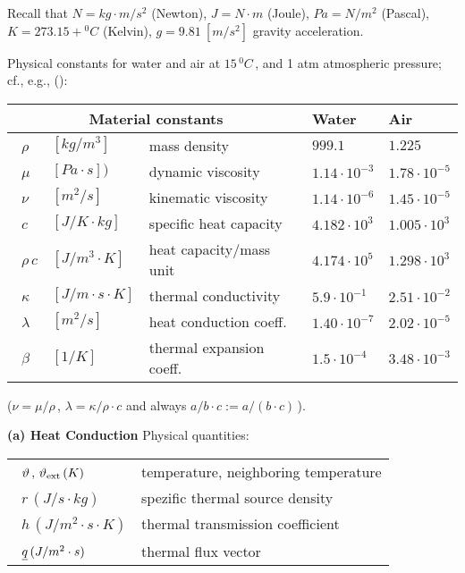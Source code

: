 \documentclass[12pt,a4paper,USenglish,twoside]{book}
\begin{document}
Recall that $N = kg\cdot m/s^2$ (Newton), $J = N\cdot m$ (Joule),
$Pa = N/m^2$ (Pascal),\\
$K = 273.15 + {}^0C$ (Kelvin), $g = 9.81\ [m/s^2]$ gravity acceleration.
\par
Physical constants for water and air at $15 \, {}^0C$\,, and 1 atm atmospheric pressure;
cf., e.g., (\cite{Ninomiya}):
\par
\renewcommand{\arraystretch}{1.1}
\bc
\begin{tabular}[H]{|lllll|}\hline
 \multicolumn{3}{|c}{Material constants}  & Water & Air \\ \hline
\ $\rho$ &$ [kg/m^3]$  & mass density & $999.1$ & $1.225$\\
\ $\mu $&$ [Pa\cdot s])$  & dynamic viscosity
& $1.14\cdot 10^{-3}$  & $1.78 \cdot 10^{-5}$ \\
\ $\nu$&$ [m^2/s]$     & kinematic viscosity
& $1.14\cdot 10^{-6}$ & $1.45 \cdot 10^{-5}$\\
\ $c$&$[J/K \cdot kg]$  & specific heat capacity 
& $4.182 \cdot 10^3$ & $1.005 \cdot 10^3$\\

\ $\rho\,c$&$ [J/m^3\cdot K]$   & heat capacity/mass unit & $4.174 \cdot 10^5$& 
$1.298\cdot 10^3$\\
\ $\kappa $&$ [J/m\cdot s \cdot K]$  & thermal conductivity
& $5.9 \cdot 10^{-1}$ & $2.51 \cdot 10^{-2}$\\
\ $\lambda$&$ [m^2/s]$ & heat conduction coeff. &
$1.40 \cdot 10^{-7}$ & $2.02 \cdot 10^{-5}$\\
\ $\beta$&$ [1/K]$  &  thermal expansion coeff. &
$1.5\cdot 10^{-4}$ & $3.48 \cdot 10^{-3}$\\ \hline
\end{tabular}
\ec
($\nu = \mu/\rho\,$, $\lambda = \kappa/\rho \cdot c$ and always 
$a/b \cdot c := a/(b\cdot c)$\,).
%

{\bf (a) Heat Conduction}
Physical quantities:
%
\bc
\begin{tabular}[H]{|ll|}\hline
\ $\theta\,, \,\theta_{\rm ext}\, (K)$       & temperature, neighboring temperature\\    \ $r\, (J/s \cdot kg)$       & spezific thermal source density  \\
\ $h \, (J/m^2\cdot s \cdot K)$       & thermal transmission coefficient\\
\ $\q \, (J/m^2 \cdot s)$      & thermal flux vector       \\
\hline
\end{tabular}
\ec
\end{document}
